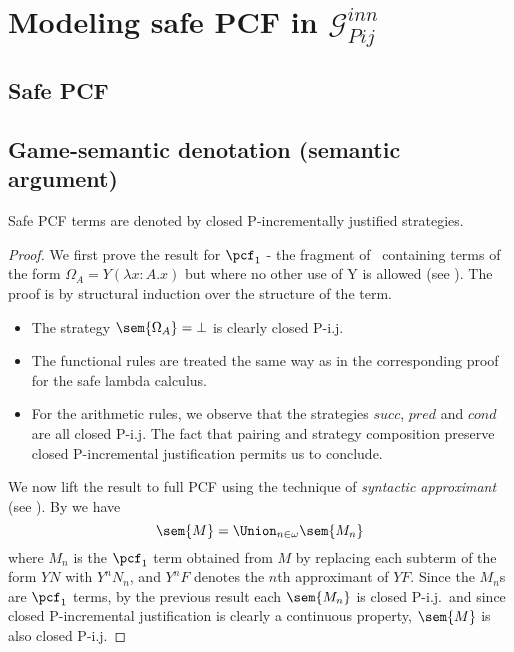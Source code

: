 \section{\texorpdfstring{Modeling safe PCF in $\mathcal{G}_{Pij}^{inn}$}
{Categorical model of safe PCF}}

\subsection{Safe PCF}


\subsection{Game-semantic denotation (semantic argument)}

\begin{proposition}
\label{prop:safepcf_closedpij} Safe PCF terms are denoted by closed
P-incrementally justified strategies.
\end{proposition}
\begin{proof}
We first prove the result for $\pcf_1$ - the fragment of \pcf\
containing terms of the form $\Omega_A = Y (\lambda x : A.x)$ but
where no other use of Y is allowed (see
\cite{abramsky:game-semantics-tutorial}). The proof is by structural
induction over the structure of the term.
\begin{itemize}
\item The strategy $\sem{\Omega_A} = \bot$ is
clearly closed P-i.j.

\item The functional rules are treated the same way as in the
corresponding proof for the safe lambda calculus.

\item For the arithmetic rules, we observe that the strategies
$succ$, $pred$ and $cond$ are all closed P-i.j. The fact that
pairing and strategy composition preserve closed P-incremental
justification permits us to conclude.
\end{itemize}

We now lift the result to full PCF using the technique of
\emph{syntactic approximant} (see
\cite{abramsky:game-semantics-tutorial}). By \cite[lemma
16]{abramsky:game-semantics-tutorial} we have
$$ \sem{M} = \Union_{n\in\omega} \sem{M_n}$$
where $M_n$ is the $\pcf_1$ term obtained from $M$ by replacing each
subterm of the form $Y N$ with $Y^n N_n$, and $Y^n F$ denotes the
$n$th approximant of $Y F$. Since the $M_n$s are $\pcf_1$ terms, by
the previous result each $\sem{M_n}$ is closed P-i.j.\ and since
closed P-incremental justification is clearly a continuous property,
$\sem{M}$ is also closed P-i.j.
\end{proof}



